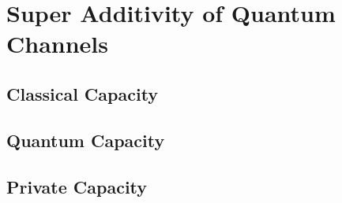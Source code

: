 \section{Super Additivity of Quantum Channels}

\subsection{Classical Capacity}

\subsection{Quantum Capacity}

\subsection{Private Capacity}